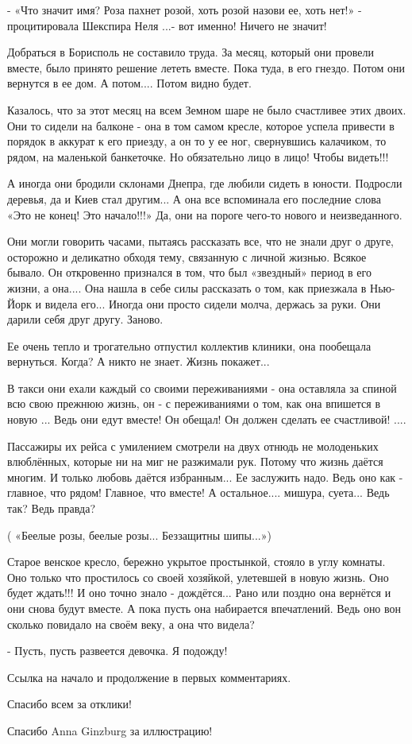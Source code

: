 - «Что значит имя? Роза пахнет розой, хоть розой назови ее, хоть нет!» -
процитировала Шекспира Неля ...- вот именно! Ничего не значит! 

Добраться в Борисполь не составило труда. За месяц, который они провели
вместе, было принято решение лететь вместе. Пока туда, в его гнездо. Потом они
вернутся в ее дом. А потом.... Потом видно будет.

Казалось, что за этот месяц на всем Земном шаре не было счастливее этих
двоих. Они то сидели на балконе - она в том самом кресле, которое успела привести
в порядок в аккурат к его приезду, а он то у ее ног, свернувшись калачиком, то
рядом, на маленькой банкеточке. Но обязательно лицо в лицо! Чтобы видеть!!! 

А иногда они бродили склонами Днепра, где любили сидеть в юности. Подросли
деревья, да и Киев стал другим... А она все вспоминала его последние слова «Это
не конец! Это начало!!!» Да, они на пороге чего-то нового и неизведанного.

Они могли говорить часами, пытаясь рассказать все, что не знали друг о
друге, осторожно и деликатно обходя тему, связанную с личной жизнью. Всякое
бывало. Он откровенно признался в том, что был «звездный» период в его жизни, а
она.... Она нашла в себе силы рассказать о том, как приезжала в Нью-Йорк и видела
его... Иногда они просто сидели молча, держась за руки. Они дарили себя друг
другу. Заново.

Ее очень тепло и трогательно отпустил коллектив клиники, она пообещала
вернуться. Когда? А никто не знает. Жизнь покажет...

В такси они ехали каждый со своими переживаниями - она оставляла за спиной всю
свою прежнюю жизнь, он - с переживаниями о том, как она впишется в новую
... Ведь они едут вместе! Он обещал! Он должен сделать ее счастливой! ....

Пассажиры их рейса с умилением смотрели на двух отнюдь не молоденьких
влюблённых, которые ни на миг не разжимали рук. Потому что жизнь даётся многим. И
только любовь даётся избранным... Ее заслужить надо. Ведь оно как - главное, что
рядом! Главное, что  вместе! А остальное.... мишура, суета... Ведь так? Ведь
правда? 

( «Беелые розы, беелые розы... Беззащитны шипы...»)

Старое венское кресло, бережно укрытое простынкой, стояло в углу комнаты. Оно
только что простилось со своей хозяйкой, улетевшей в новую жизнь. Оно будет
ждать!!! И оно точно знало - дождётся... Рано или поздно она вернётся и они
снова будут вместе. А пока пусть она набирается впечатлений. Ведь оно вон
сколько повидало на своём веку, а она что видела? 

- Пусть, пусть развеется девочка. Я подожду! 

Ссылка на начало и продолжение в первых комментариях.

Спасибо всем за отклики! 

Спасибо Anna Ginzburg за иллюстрацию!



